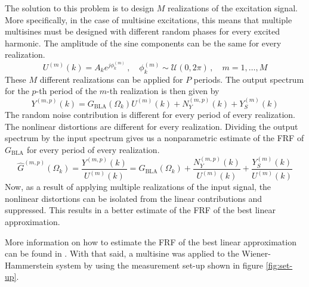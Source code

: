 The solution to this problem is to design $M$ realizations of the excitation signal. More specifically, in the case of multisine excitations, this means that multiple multisines must be designed with different random phases for every excited harmonic. The amplitude of the sine components can be the same for every realization.
\begin{equation*}
	U^{(m)}(k) = A_k e^{j \phi_k^{(m)}} \,, \quad \phi_k^{(m)} \sim \mathcal{U}(0,2\pi) \,, \quad m = 1,\ldots,M
\end{equation*}
These $M$ different realizations can be applied for $P$ periods. The output spectrum for the $p$-th period of the $m$-th realization is then given by
\begin{equation*}
	Y^{(m,p)}(k) = G_{\textrm{BLA}}(\Omega_k) U^{(m)}(k) + N_Y^{(m,p)}(k) + Y_S^{(m)}(k) 
\end{equation*}
The random noise contribution is different for every period of every realization. The nonlinear distortions are different for every realization. Dividing the output spectrum by the input spectrum gives us a nonparametric estimate of the FRF of $G_{\textrm{BLA}}$ for every period of every realization.
\begin{equation*}
	\hat G^{(m,p)}(\Omega_k) = \frac{Y^{(m,p)}(k)}{U^{(m)}(k)} = G_{\textrm{BLA}}(\Omega_k)  + \frac{N_Y^{(m,p)}(k)}{U^{(m)}(k)} + \frac{Y_S^{(m)}(k)}{U^{(m)}(k)}
\end{equation*}
Now, as a result of applying multiple realizations of the input signal, the nonlinear distortions can be isolated from the linear contributions and suppressed. This results in a better estimate of the FRF of the best linear approximation. 

More information on how to estimate the FRF of the best linear approximation can be found in \cite[Chapter 4]{pintelon_book}. With that said, a multisine was applied to the \mbox{Wiener-Hammerstein} system by using the measurement set-up shown in figure \ref{fig:set-up}. 

